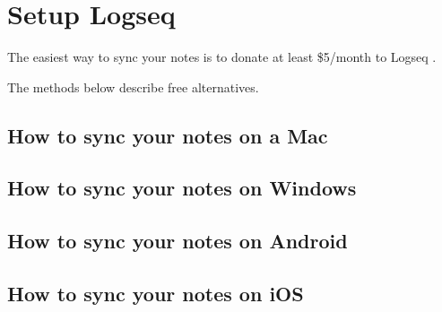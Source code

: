 \section{Setup Logseq}\label{sec:setup-logseq}

The easiest way to sync your notes is to donate at least \$5/month to Logseq \cite{logseq_sync}.

The methods below describe free alternatives.

\subsection{How to sync your notes on a Mac}\label{subsec:how-to-sync-your-notes-on-a-mac}

\subsection{How to sync your notes on Windows}\label{subsec:how-to-sync-your-notes-on-windows}

\subsection{How to sync your notes on Android}\label{subsec:how-to-sync-your-notes-on-android}

\subsection{How to sync your notes on iOS}\label{subsec:how-to-sync-your-notes-on-ios}
